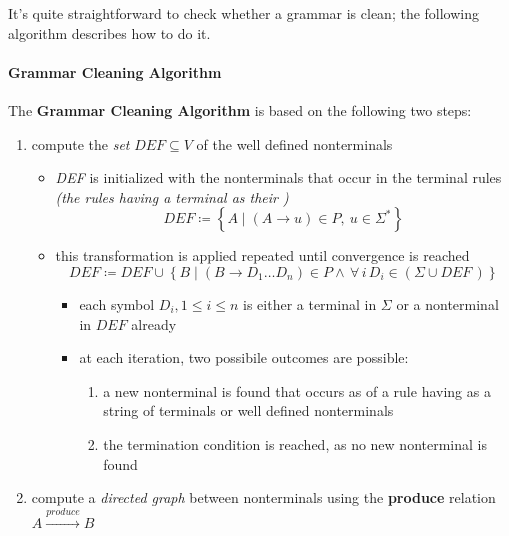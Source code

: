 \documentclass[english]{article}
\begin{document}
It's quite straightforward to check whether a grammar is clean;
the following algorithm describes how to do it.

\paragraph{Grammar Cleaning Algorithm}

The \textbf{Grammar Cleaning Algorithm} is based on the following two steps:

\begin{enumerate}[label=\textbf{step \arabic*}:, ref=(\textbf{\arabic*}), left=20pt]
  \item compute the \textit{set} \(\textit{DEF} \subseteq V\) of the well defined nonterminals
        \begin{itemize}
          \item \textit{DEF} is initialized with the nonterminals that occur in the terminal rules \textit{(the rules having a terminal as their \RP)}
                \[ \textit{DEF} \coloneqq \left\{ A \mid (A \rightarrow u) \in P, \ u \in \Sigma^\ast  \right\} \]
          \item this transformation is applied repeated until convergence is reached
                \[ \textit{DEF} \coloneqq \textit{DEF} \cup \left\{ B \mid (B \rightarrow D_1 \ldots D_n) \in P \land \, \forall \, i \, D_i \in \left(\Sigma \cup \textit{DEF} \,\right)\right\} \]
                \begin{itemize}
                  \item each symbol \(D_i, 1 \leq i \leq n\) is either a terminal in \(\Sigma\) or a nonterminal in \(\textit{DEF}\) already
                  \item at each iteration, two possibile outcomes are possible:
                        \begin{enumerate}
                          \item a new nonterminal is found that occurs as \LP of a rule having as \RP a string of terminals or well defined nonterminals
                          \item the termination condition is reached, as no new nonterminal is found
                        \end{enumerate}
                \end{itemize}
        \end{itemize}
  \item compute a \textit{directed graph} between nonterminals using the \textbf{produce} relation \(A \xrightarrow{produce} B\)

\end{enumerate}
\end{document}
